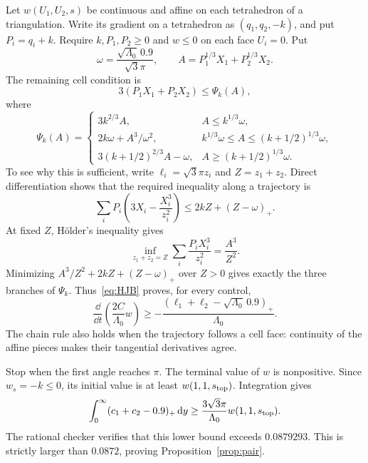 Let $w(U_1,U_2,s)$ be continuous and affine on each tetrahedron of a triangulation. Write its gradient on a tetrahedron as $(q_1,q_2,-k)$, and put $P_i=q_i+k$. Require $k,P_1,P_2\ge0$ and $w\le0$ on each face $U_i=0$. Put
\[
 \omega=\frac{\sqrt{\Lambda_0}\,0.9}{\sqrt3\pi},\qquad
 A=P_1^{1/3}X_1+P_2^{1/3}X_2.
\]
The remaining cell condition is
\begin{equation}\label{eq:HJB}
 3(P_1X_1+P_2X_2)\le\Psi_k(A),
\end{equation}
where
\[
\Psi_k(A)=
\begin{cases}
3k^{2/3}A,&A\le k^{1/3}\omega,\\
2k\omega+A^3/\omega^2,&k^{1/3}\omega\le A\le(k+1/2)^{1/3}\omega,\\
3(k+1/2)^{2/3}A-\omega,&A\ge(k+1/2)^{1/3}\omega.
\end{cases}
\]
To see why this is sufficient, write $\ell_i=\sqrt3\pi z_i$ and $Z=z_1+z_2$. Direct differentiation shows that the required inequality along a trajectory is
\[
 \sum_i P_i\left(3X_i-\frac{X_i^3}{z_i^2}\right)
 \le 2kZ+(Z-\omega)_+.
\]
At fixed $Z$, H\"older's inequality gives
\[
 \inf_{z_1+z_2=Z}\sum_i\frac{P_iX_i^3}{z_i^2}=\frac{A^3}{Z^2}.
\]
Minimizing $A^3/Z^2+2kZ+(Z-\omega)_+$ over $Z>0$ gives exactly the three branches of $\Psi_k$. Thus~\eqref{eq:HJB} proves, for every control,
\[
 \frac{\dd}{\dd t}\left(\frac{2C}{\Lambda_0}w\right)
 \ge-\frac{(\ell_1+\ell_2-\sqrt{\Lambda_0}\,0.9)_+}{\Lambda_0}.
\]
The chain rule also holds when the trajectory follows a cell face: continuity of the affine pieces makes their tangential derivatives agree.

Stop when the first angle reaches $\pi$. The terminal value of $w$ is nonpositive. Since $w_s=-k\le0$, its initial value is at least $w(1,1,s_{\rm top})$. Integration gives
\[
 \int_0^\infty(c_1+c_2-0.9)_+\,\mathrm d y
 \ge\frac{3\sqrt3\pi}{\Lambda_0}w(1,1,s_{\rm top}).
\]
The rational checker verifies that this lower bound exceeds $0.0879293$. This is strictly larger than $0.0872$, proving Proposition~\ref{prop:pair}.

